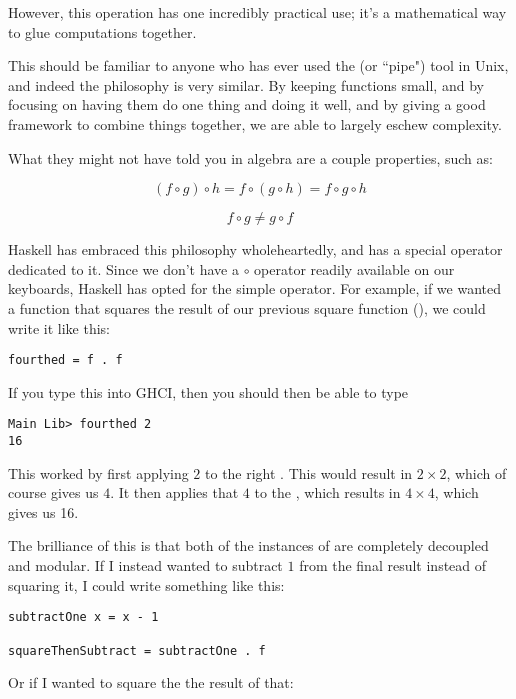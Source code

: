 However, this operation has one incredibly practical use; it's a mathematical way to glue computations together.  

This should be familiar to anyone who has ever used the \inlinecode{|} (or ``pipe") tool in Unix, and indeed the philosophy is very similar.  By keeping functions small, and by focusing on having them do one thing and doing it well, and by giving a good framework to combine things together, we are able to largely eschew complexity.  

What they might not have told you in algebra are a couple properties, such as:   

$$
\left(f \circ g\right) \circ h = f \circ \left(g \circ h \right) = f \circ g \circ h
$$

$$
f \circ g \neq g \circ f
$$

Haskell has embraced this philosophy wholeheartedly, and has a special operator dedicated to it.  Since we don't have a $\circ$ operator readily available on our keyboards, Haskell has opted for the simple  operator.  For example, if we wanted a function that squares the result of our previous square function (), we could write it like this: 

\begin{verbatim}
fourthed = f . f
\end{verbatim}

If you type this into GHCI, then you should then be able to type 

\begin{verbatim}
Main Lib> fourthed 2
16
\end{verbatim}

This worked by first applying $2$ to the right . This would result in $2 \times 2$, which of course gives us $4$. It then applies that $4$ to the , which results in $4 \times 4$, which gives us 16. 

The brilliance of this is that both of the instances of  are completely decoupled and modular.  If I instead wanted to subtract $1$ from the final result instead of squaring it, I could write something like this: 

\begin{verbatim}
subtractOne x = x - 1

squareThenSubtract = subtractOne . f
\end{verbatim}

Or if I wanted to square the the result of that: 

